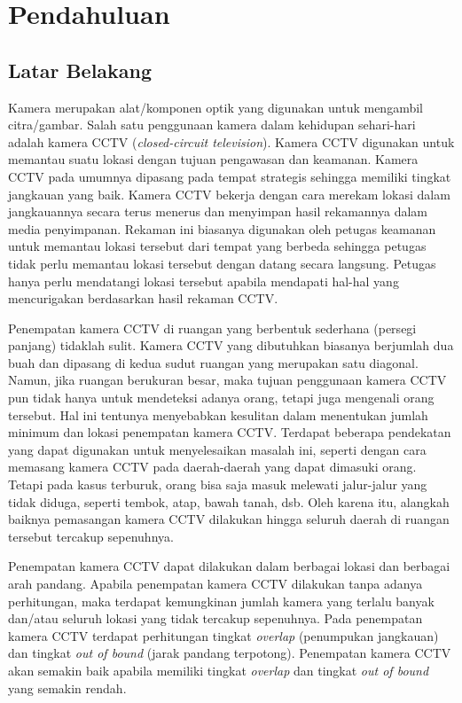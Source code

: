 \chapter{Pendahuluan}
\label{chap:intro}
   
\section{Latar Belakang}
\label{sec:label}

Kamera merupakan alat/komponen optik yang digunakan untuk mengambil citra/gambar. Salah satu penggunaan kamera dalam kehidupan sehari-hari adalah kamera CCTV (\textit{closed-circuit television}). Kamera CCTV digunakan untuk memantau suatu lokasi dengan tujuan pengawasan dan keamanan. Kamera CCTV pada umumnya dipasang pada tempat strategis sehingga memiliki tingkat jangkauan yang baik. Kamera CCTV bekerja dengan cara merekam lokasi dalam jangkauannya secara terus menerus dan menyimpan hasil rekamannya dalam media penyimpanan. Rekaman ini biasanya digunakan oleh petugas keamanan untuk memantau lokasi tersebut dari tempat yang berbeda sehingga petugas tidak perlu memantau lokasi tersebut dengan datang secara langsung. Petugas hanya perlu mendatangi lokasi tersebut apabila mendapati hal-hal yang mencurigakan berdasarkan hasil rekaman CCTV.

Penempatan kamera CCTV di ruangan yang berbentuk sederhana (persegi panjang) tidaklah sulit. Kamera CCTV yang dibutuhkan biasanya berjumlah dua buah dan dipasang di kedua sudut ruangan yang merupakan satu diagonal. Namun, jika ruangan berukuran besar, maka tujuan penggunaan kamera CCTV pun tidak hanya untuk mendeteksi adanya orang, tetapi juga mengenali orang tersebut. Hal ini tentunya menyebabkan kesulitan dalam menentukan jumlah minimum dan lokasi penempatan kamera CCTV. Terdapat beberapa pendekatan yang dapat digunakan untuk menyelesaikan masalah ini, seperti dengan cara memasang kamera CCTV pada daerah-daerah yang dapat dimasuki orang. Tetapi pada kasus terburuk, orang bisa saja masuk melewati jalur-jalur yang tidak diduga, seperti tembok, atap, bawah tanah, dsb. Oleh karena itu, alangkah baiknya pemasangan kamera CCTV dilakukan hingga seluruh daerah di ruangan tersebut tercakup sepenuhnya.

Penempatan kamera CCTV dapat dilakukan dalam berbagai lokasi dan berbagai arah pandang. Apabila penempatan kamera CCTV dilakukan tanpa adanya perhitungan, maka terdapat kemungkinan jumlah kamera yang terlalu banyak dan/atau seluruh lokasi yang tidak tercakup sepenuhnya. Pada penempatan kamera CCTV terdapat perhitungan tingkat \textit{overlap} (penumpukan jangkauan) dan tingkat \textit{out of bound} (jarak pandang terpotong). Penempatan kamera CCTV akan semakin baik apabila memiliki tingkat \textit{overlap} dan tingkat \textit{out of bound} yang semakin rendah.

